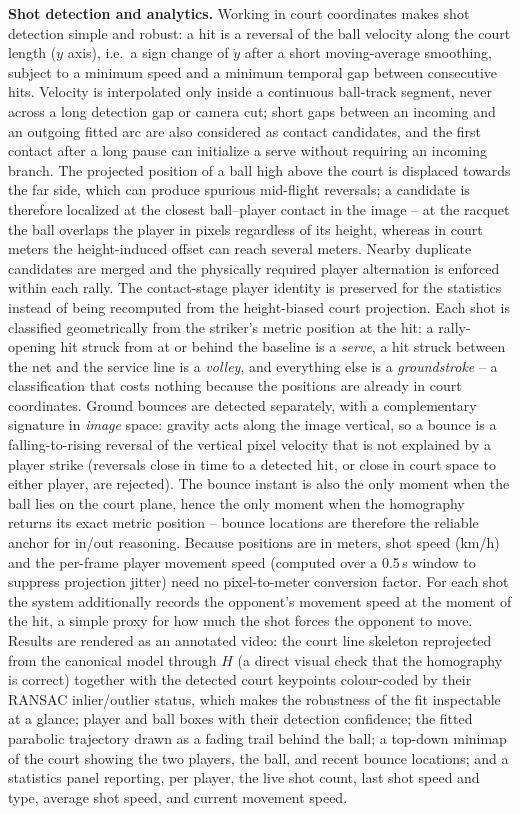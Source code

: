 \documentclass[10pt,twocolumn,a4paper]{article}
\begin{document}
	\textbf{Shot detection and analytics.} Working in court coordinates makes shot detection simple and robust: a hit is a reversal of the ball velocity along the court length ($y$ axis), i.e.\ a sign change of $\dot y$ after a short moving-average smoothing, subject to a minimum speed and a minimum temporal gap between consecutive hits. Velocity is interpolated only inside a continuous ball-track segment, never across a long detection gap or camera cut; short gaps between an incoming and an outgoing fitted arc are also considered as contact candidates, and the first contact after a long pause can initialize a serve without requiring an incoming branch. The projected position of a ball high above the court is displaced towards the far side, which can produce spurious mid-flight reversals; a candidate is therefore localized at the closest ball--player contact in the image -- at the racquet the ball overlaps the player in pixels regardless of its height, whereas in court meters the height-induced offset can reach several meters. Nearby duplicate candidates are merged and the physically required player alternation is enforced within each rally. The contact-stage player identity is preserved for the statistics instead of being recomputed from the height-biased court projection. Each shot is classified geometrically from the striker's metric position at the hit: a rally-opening hit struck from at or behind the baseline is a \emph{serve}, a hit struck between the net and the service line is a \emph{volley}, and everything else is a \emph{groundstroke} -- a classification that costs nothing because the positions are already in court coordinates. Ground bounces are detected separately, with a complementary signature in \emph{image} space: gravity acts along the image vertical, so a bounce is a falling-to-rising reversal of the vertical pixel velocity that is not explained by a player strike (reversals close in time to a detected hit, or close in court space to either player, are rejected). The bounce instant is also the only moment when the ball lies on the court plane, hence the only moment when the homography returns its exact metric position -- bounce locations are therefore the reliable anchor for in/out reasoning. Because positions are in meters, shot speed (km/h) and the per-frame player movement speed (computed over a 0.5\,s window to suppress projection jitter) need no pixel-to-meter conversion factor. For each shot the system additionally records the opponent's movement speed at the moment of the hit, a simple proxy for how much the shot forces the opponent to move. Results are rendered as an annotated video: the court line skeleton reprojected from the canonical model through $H$ (a direct visual check that the homography is correct) together with the detected court keypoints colour-coded by their RANSAC inlier/outlier status, which makes the robustness of the fit inspectable at a glance; player and ball boxes with their detection confidence; the fitted parabolic trajectory drawn as a fading trail behind the ball; a top-down minimap of the court showing the two players, the ball, and recent bounce locations; and a statistics panel reporting, per player, the live shot count, last shot speed and type, average shot speed, and current movement speed.
\end{document}
